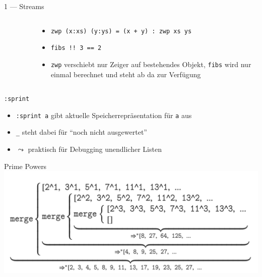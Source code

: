 \documentclass{beamer}
\begin{document}
\begin{frame}{1 --- Streams}
{\begin{columns}
\begin{column}{0.6\textwidth}
\begin{figure}
                \end{figure}
            \end{column}
            \begin{column}{0.4\textwidth}
                \footnotesize
                \begin{itemize}
                    \item \texttt{zwp (x:xs) (y:ys) = (x + y) : zwp xs ys}
                    \item \texttt{fibs !! 3 == 2}
                    \item \texttt{zwp} verschiebt nur Zeiger auf bestehendes Objekt, \texttt{fibs} wird nur einmal berechnet und steht ab da zur Verfügung
                \end{itemize}
            \end{column}
        \end{columns}
    }
\end{frame}

\begin{frame}{\texttt{:sprint}}

	\begin{itemize}
		\item \texttt{:sprint a} gibt aktuelle Speicherrepräsentation für \texttt{a} aus
		\item \texttt{\_} steht dabei für \enquote{noch nicht ausgewertet}
		\item $\leadsto$ praktisch für Debugging unendlicher Listen
	\end{itemize}
\end{frame}

\begin{frame}{Prime Powers}
    \includegraphics[scale=0.27]{slides/images/primepowers.png}
\end{frame}
\end{document}
